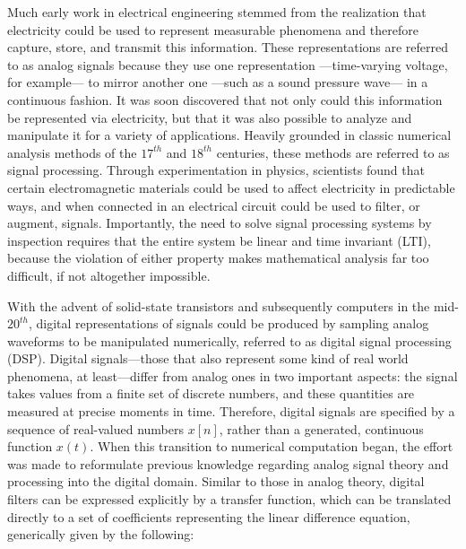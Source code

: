 
Much early work in electrical engineering stemmed from the realization that electricity could be used to represent measurable phenomena and therefore capture, store, and transmit this information.
These representations are referred to as analog signals because they use one representation ---time-varying voltage, for example--- to mirror another one ---such as a sound pressure wave--- in a continuous fashion.
It was soon discovered that not only could this information be represented via electricity, but that it was also possible to analyze and manipulate it for a variety of applications.
Heavily grounded in classic numerical analysis methods of the $17^{th}$ and $18^{th}$ centuries, these methods are referred to as signal processing.
Through experimentation in physics, scientists found that certain electromagnetic materials could be used to affect electricity in predictable ways, and when connected in an electrical circuit could be used to filter, or augment, signals.
Importantly, the need to solve signal processing systems by inspection requires that the entire system be linear and time invariant (LTI), because the violation of either property makes mathematical analysis far too difficult, if not altogether impossible.

With the advent of solid-state transistors and subsequently computers in the mid-$20^{th}$, digital representations of signals could be produced by sampling analog waveforms to be manipulated numerically, referred to as digital signal processing (DSP).
Digital signals---those that also represent some kind of real world phenomena, at least---differ from analog ones in two important aspects: the signal takes values from a finite set of discrete numbers, and these quantities are measured at precise moments in time.
Therefore, digital signals are specified by a sequence of real-valued numbers $x[n]$, rather than a generated, continuous function $x(t)$.
When this transition to numerical computation began, the effort was made to reformulate previous knowledge regarding analog signal theory and processing into the digital domain.
Similar to those in analog theory, digital filters can be expressed explicitly by a transfer function, which can be translated directly to a set of coefficients representing the linear difference equation, generically given by the following:

